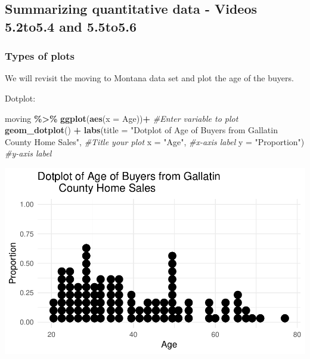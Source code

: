 \documentclass[
]{report}
\newenvironment{Shaded}{\begin{snugshade}}{\end{snugshade}}
\newcommand{\AttributeTok}[1]{\textcolor[rgb]{0.13,0.29,0.53}{#1}}
\newcommand{\CommentTok}[1]{\textcolor[rgb]{0.56,0.35,0.01}{\textit{#1}}}
\newcommand{\FunctionTok}[1]{\textcolor[rgb]{0.13,0.29,0.53}{\textbf{#1}}}
\newcommand{\NormalTok}[1]{#1}
\newcommand{\SpecialCharTok}[1]{\textcolor[rgb]{0.81,0.36,0.00}{\textbf{#1}}}
\newcommand{\StringTok}[1]{\textcolor[rgb]{0.31,0.60,0.02}{#1}}
\begin{document}

\subsection*{Summarizing quantitative data - Videos 5.2to5.4 and 5.5to5.6}\label{summarizing-quantitative-data---videos-5.2to5.4-and-5.5to5.6}

\subsubsection*{Types of plots}\label{types-of-plots}

We will revisit the moving to Montana data set and plot the age of the buyers.

Dotplot:

\vspace{0.5in}

\begin{Shaded}
\begin{Highlighting}[]
\NormalTok{moving }\SpecialCharTok{\%\textgreater{}\%}
  \FunctionTok{ggplot}\NormalTok{(}\FunctionTok{aes}\NormalTok{(}\AttributeTok{x =}\NormalTok{ Age))}\SpecialCharTok{+} \CommentTok{\#Enter variable to plot}
  \FunctionTok{geom\_dotplot}\NormalTok{() }\SpecialCharTok{+} 
  \FunctionTok{labs}\NormalTok{(}\AttributeTok{title =} \StringTok{"Dotplot of Age of Buyers from Gallatin }
\StringTok{       County Home Sales"}\NormalTok{, }\CommentTok{\#Title your plot}
       \AttributeTok{x =} \StringTok{"Age"}\NormalTok{, }\CommentTok{\#x{-}axis label}
       \AttributeTok{y =} \StringTok{"Proportion"}\NormalTok{) }\CommentTok{\#y{-}axis label}
\end{Highlighting}
\end{Shaded}

\begin{center}\includegraphics[width=0.75\linewidth]{06-VN06-EDAonemeanSim_files/figure-latex/unnamed-chunk-2-1} \end{center}
\end{document}
